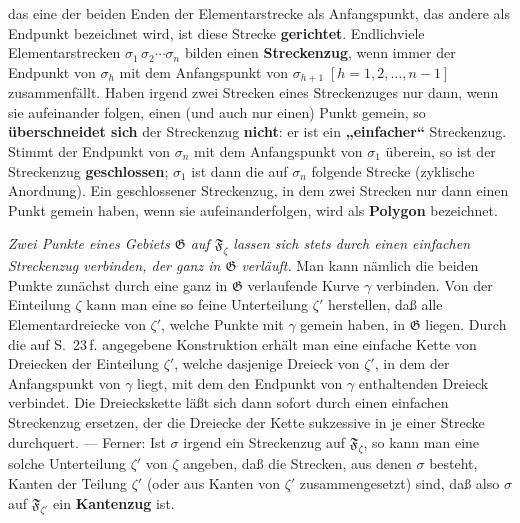 \documentclass{article}
\begin{document}
das eine der beiden Enden der Elementarstrecke als Anfangspunkt, das andere als Endpunkt bezeichnet wird, ist diese Strecke \textbf{gerichtet}. Endlichviele Elementarstrecken $\sigma_1\,\sigma_2 \cdots \sigma_n$ bilden einen \textbf{Streckenzug}, wenn immer der Endpunkt von $\sigma_h$ mit dem Anfangspunkt von $\sigma_{h+1}\;[h = 1, 2, \dots, n-1]$ zusammenfällt. Haben irgend zwei Strecken eines Streckenzuges nur dann, wenn sie aufeinander folgen, einen (und auch nur einen) Punkt gemein, so \textbf{überschneidet sich} der Streckenzug \textbf{nicht}: er ist ein \textbf{„einfacher“} Streckenzug. Stimmt der Endpunkt von $\sigma_n$ mit dem Anfangspunkt von $\sigma_1$ überein, so ist der Streckenzug \textbf{geschlossen}; $\sigma_1$ ist dann die auf $\sigma_n$ folgende Strecke (zyklische Anordnung). Ein geschlossener Streckenzug, in dem zwei Strecken nur dann einen Punkt gemein haben, wenn sie aufeinanderfolgen, wird als \textbf{Polygon} bezeichnet.

\emph{Zwei Punkte eines Gebiets $\mathfrak{G}$ auf $\mathfrak{F}_\zeta$ lassen sich stets durch einen einfachen Streckenzug verbinden, der ganz in $\mathfrak{G}$ verläuft.} Man kann nämlich die beiden Punkte zunächst durch eine ganz in $\mathfrak{G}$ verlaufende Kurve $\gamma$ verbinden. Von der Einteilung $\zeta$ kann man eine so feine Unterteilung $\zeta'$ herstellen, daß alle Elementardreiecke von $\zeta'$, welche Punkte mit $\gamma$ gemein haben, in $\mathfrak{G}$ liegen. Durch die auf S.~23\,f. angegebene Konstruktion erhält man eine einfache Kette von Dreiecken der Einteilung $\zeta'$, welche dasjenige Dreieck von $\zeta'$, in dem der Anfangspunkt von $\gamma$ liegt, mit dem den Endpunkt von $\gamma$ enthaltenden Dreieck verbindet. Die Dreieckskette läßt sich dann sofort durch einen einfachen Streckenzug ersetzen, der die Dreiecke der Kette sukzessive in je einer Strecke durchquert. --- Ferner: Ist $\sigma$ irgend ein Streckenzug auf $\mathfrak{F}_\zeta$, so kann man eine solche Unterteilung $\zeta'$ von $\zeta$ angeben, daß die Strecken, aus denen $\sigma$ besteht, Kanten der Teilung $\zeta'$ (oder aus Kanten von $\zeta'$ zusammengesetzt) sind, daß also $\sigma$ auf $\mathfrak{F}_{\zeta'}$ ein \textbf{Kantenzug} ist.

\end{document}
